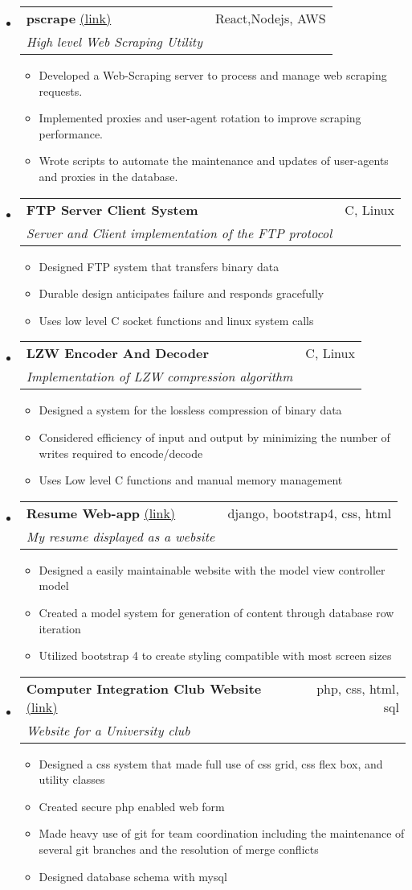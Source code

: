 \documentclass[letterpaper,11pt]{article}
\makeatletter
\newcommand{\resumeItem}[2]{
  \item\small{
    \textbf{#1}{ #2 \vspace{-2pt}}
  }
}
\newcommand{\resumeSubheading}[5]{
  \vspace{-1pt}\item
    \begin{tabular*}{0.97\textwidth}[t]{l@{\extracolsep{\fill}}r}
      \textbf{#1} #2 & #3 \\
      \textit{\small#4} & \textit{\small #5} \\
    \end{tabular*}\vspace{-5pt}
}
\newcommand{\resumeSubItem}[2]{\resumeItem{#1}{#2}\vspace{-4pt}}
\newcommand{\resumeSubHeadingListStart}{\begin{itemize}[leftmargin=*]}
\newcommand{\resumeSubHeadingListEnd}{\end{itemize}}
\makeatother
\begin{document}
  \resumeSubHeadingListStart
  \resumeSubheading{pscrape}{\href{https://github.com/munikeraragon/p_scrape}{(link)}}{React,Nodejs, AWS}{High level Web Scraping Utility}{}
    \resumeSubHeadingListStart
      \resumeSubItem{}{Developed a Web-Scraping server to process and manage web scraping requests.}
      \resumeSubItem{}{Implemented proxies and user-agent rotation to improve scraping performance.}
      \resumeSubItem{}{Wrote scripts to automate the maintenance and updates of user-agents and proxies in the database.}
    \resumeSubHeadingListEnd
  \resumeSubHeadingListEnd
  
  \resumeSubHeadingListStart
  \resumeSubheading{FTP Server Client System}{}{C, Linux}{Server and Client implementation of the FTP protocol}{}
    \resumeSubHeadingListStart
      \resumeSubItem{}{Designed FTP system that transfers binary data}
      \resumeSubItem{}{Durable design anticipates failure and responds gracefully}
      \resumeSubItem{}{Uses low level C socket functions and linux system calls}
    \resumeSubHeadingListEnd
  \resumeSubHeadingListEnd

  \resumeSubHeadingListStart
    \resumeSubheading{LZW Encoder And Decoder}{}{C, Linux}{Implementation of LZW compression algorithm}{}
    \resumeSubHeadingListStart
      \resumeSubItem{}{Designed a system for the lossless compression of binary data}
      \resumeSubItem{}{Considered efficiency of input and output by minimizing the number of writes required to encode/decode}
      \resumeSubItem{}{Uses Low level C functions and manual memory management}
    \resumeSubHeadingListEnd
  \resumeSubHeadingListEnd
                                      
  \resumeSubHeadingListStart
  \resumeSubheading{Resume Web-app}{\href{http://www.treverhibbs.com/}{(link)}}{django, bootstrap4, css, html}{My resume displayed as a website}{}
    \resumeSubHeadingListStart
      \resumeSubItem{}{Designed a easily maintainable website with the model view controller model}
      \resumeSubItem{}{Created a model system for generation of content through database row iteration}
      \resumeSubItem{}{Utilized bootstrap 4 to create styling compatible with most screen sizes}
    \resumeSubHeadingListEnd
  \resumeSubHeadingListEnd

  \resumeSubHeadingListStart
  \resumeSubheading{Computer Integration Club Website}{\href{http://www6.encs.vancouver.wsu.edu/}{(link)}}{php, css, html, sql}{Website for a University club}{}
    \resumeSubHeadingListStart
      \resumeSubItem{}{Designed a css system that made full use of css grid, css flex box, and utility classes}
      \resumeSubItem{}{Created secure php enabled web form}
      \resumeSubItem{}{Made heavy use of git for team coordination including the maintenance of several git branches and the resolution of merge conflicts}
      \resumeSubItem{}{Designed database schema with mysql}
    \resumeSubHeadingListEnd
  \resumeSubHeadingListEnd
\end{document}
